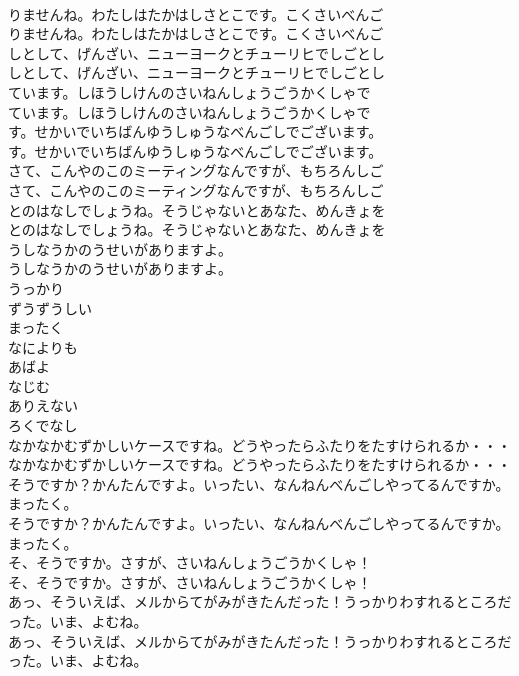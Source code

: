 \documentclass[8pt]{extreport}
\begin{document}
\begin{CJK}{UTF8}{min}
\\	りませんね。わたしはたかはしさとこです。こくさいべんご
\\	りませんね。わたしはたかはしさとこです。こくさいべんご
\\	しとして、げんざい、ニューヨークとチューリヒでしごとし
\\	しとして、げんざい、ニューヨークとチューリヒでしごとし
\\	ています。しほうしけんのさいねんしょうごうかくしゃで
\\	ています。しほうしけんのさいねんしょうごうかくしゃで
\\	す。せかいでいちばんゆうしゅうなべんごしでございます。
\\	す。せかいでいちばんゆうしゅうなべんごしでございます。
\\	さて、こんやのこのミーティングなんですが、もちろんしご
\\	さて、こんやのこのミーティングなんですが、もちろんしご
\\	とのはなしでしょうね。そうじゃないとあなた、めんきょを
\\	とのはなしでしょうね。そうじゃないとあなた、めんきょを
\\	うしなうかのうせいがありますよ。
\\	うしなうかのうせいがありますよ。
\\	うっかり
\\	ずうずうしい
\\	まったく
\\	なによりも
\\	あばよ
\\	なじむ
\\	ありえない
\\	ろくでなし
\\	なかなかむずかしいケースですね。どうやったらふたりをたすけられるか・・・
\\	なかなかむずかしいケースですね。どうやったらふたりをたすけられるか・・・
\\	そうですか？かんたんですよ。いったい、なんねんべんごしやってるんですか。まったく。
\\	そうですか？かんたんですよ。いったい、なんねんべんごしやってるんですか。まったく。
\\	そ、そうですか。さすが、さいねんしょうごうかくしゃ！
\\	そ、そうですか。さすが、さいねんしょうごうかくしゃ！
\\	あっ、そういえば、メルからてがみがきたんだった！うっかりわすれるところだった。いま、よむね。
\\	あっ、そういえば、メルからてがみがきたんだった！うっかりわすれるところだった。いま、よむね。

\end{CJK}
\end{document}
